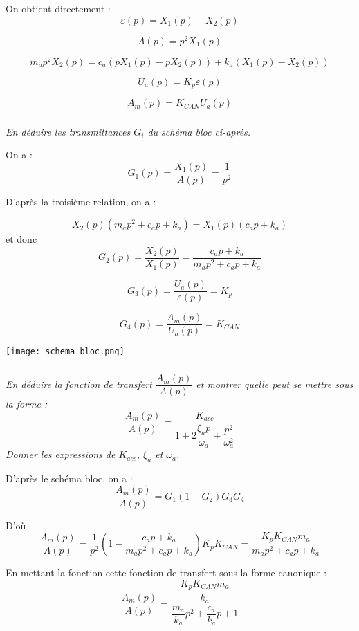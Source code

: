 \begin{multicols}{2}
\begin{corrige}
On obtient directement : 
$$
\varepsilon(p)=X_1(p)-X_2(p)
$$

$$
A(p)=p^2 X_1(p)
$$

$$
m_a p^2 X_2(p)=c_a \left( pX_1(p) - pX_2(p)\right)+k_a\left( X_1(p)
-X_2(p) \right)
$$

$$
U_a(p)=K_p \varepsilon(p)
$$

$$
A_m(p)=K_{CAN} U_a(p)
$$
\end{corrige}

\newpage

\else
\fi

\subparagraph{}
\textit{En déduire les transmittances $G_i$ du schéma bloc ci-après.}
\ifprof
\begin{corrige}
On a : 
$$
G_1(p) = \dfrac{X_1(p)}{A(p)}=\dfrac{1}{p^2}
$$

D'après la troisième relation, on a :

$$
X_2(p)\left( m_a p^2 +c_a p + k_a \right) = X_1(p) \left( c_a p + k_a  \right)
$$
 et donc 
$$
G_2(p) = \dfrac{X_2(p)}{X_1(p)} = \dfrac{c_a p + k_a}{m_a p^2 +c_a p + k_a}
$$

$$
G_3(p) = \dfrac{U_a(p)}{\varepsilon(p)} = K_p
$$

$$
G_4(p) = \dfrac{A_m(p)}{U_a(p)} = K_{CAN}
$$

\end{corrige}
\else
\fi

\begin{center}
\texttt{[image: schema\_bloc.png]}
\end{center}

\subparagraph{}
\textit{En déduire la fonction de transfert $\dfrac{A_m(p)}{A(p)}$ et montrer quelle peut se mettre sous la
forme :}
$$
\dfrac{A_m(p)}{A(p)} = \dfrac{K_{acc}}{1+2\dfrac{\xi_a p}{\omega_a} + \dfrac{p^2}{\omega_a^2}}
$$
\textit{Donner les expressions de $K_{acc}$, $\xi_a$ et $\omega_a$.}

\ifprof
\begin{corrige}

D'après le schéma bloc, on a : 
$$
 \dfrac{A_m(p)}{A(p)} = G_1 \left(1 - G_2 \right) G_3 G_4 
$$

D'où 
$$
 \dfrac{A_m(p)}{A(p)} = \dfrac{1}{p^2} \left( 1- \dfrac{c_a p + k_a}{m_a p^2
+c_a p + k_a} \right)  K_p K_{CAN} =
\dfrac{K_p K_{CAN} m_a}{m_a p^2 +c_a p + k_a}
$$

En mettant la fonction cette fonction de transfert sous la forme canonique :
$$
\dfrac{A_m(p)}{A(p)} = \dfrac{\dfrac{K_p K_{CAN} m_a}{k_a}}{\dfrac{m_a}{k_a}p^2
+ \dfrac{c_a}{k_a}p+1}
$$


\end{corrige}
\end{multicols}
